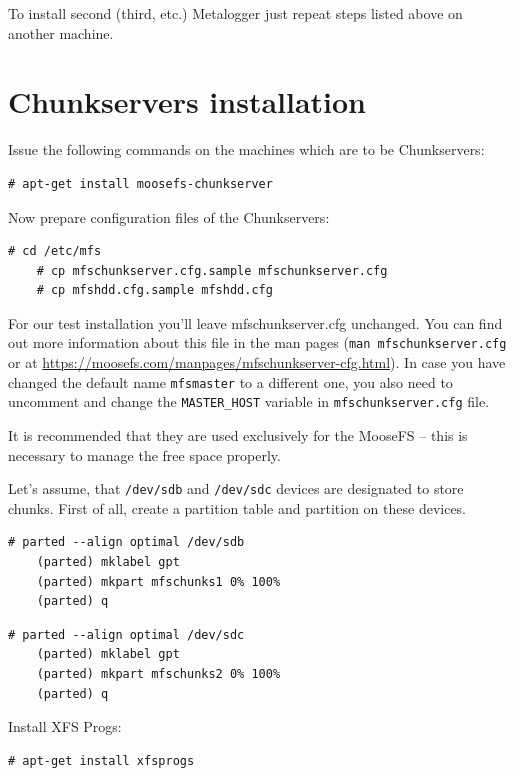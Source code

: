\documentclass[a4paper,11pt,english]{report}
\def\code#1{\texttt{#1}}
\begin{document}
			To install second (third, etc.) Metalogger just repeat steps listed above on another machine.
			
		\section{Chunkservers installation}
			Issue the following commands on the machines which are to be Chunkservers:
			
			\begin{lstlisting}[caption={Installing MooseFS Chunkserver}]
	# apt-get install moosefs-chunkserver
			\end{lstlisting}
			
			
			Now prepare configuration files of the Chunkservers:
			
			\begin{lstlisting}[caption={Preparing configuration files}]
	# cd /etc/mfs
	# cp mfschunkserver.cfg.sample mfschunkserver.cfg
	# cp mfshdd.cfg.sample mfshdd.cfg
			\end{lstlisting}
			
			
			For our test installation you'll leave mfschunkserver.cfg unchanged. You can find out more information about this file in the man pages (\code{man mfschunkserver.cfg} or at \url{https://moosefs.com/manpages/mfschunkserver-cfg.html}).
			In case you have changed the default name \code{mfsmaster} to a different one, you also need to uncomment and change the \code{MASTER\_HOST} variable in \code{mfschunkserver.cfg} file.
			
			It is recommended that they are used exclusively for the MooseFS -- this is necessary to manage the free space properly.
			
			Let's assume, that \code{/dev/sdb} and \code{/dev/sdc} devices are designated to store chunks. First of all, create a partition table and partition on these devices. 
			\begin{lstlisting}[caption={Creating a partition on \code{/dev/sdb}}]
	# parted --align optimal /dev/sdb
	(parted) mklabel gpt
	(parted) mkpart mfschunks1 0% 100%
	(parted) q
			\end{lstlisting}
			
			\begin{lstlisting}[caption={Creating a partition on \code{/dev/sdc}}]
	# parted --align optimal /dev/sdc
	(parted) mklabel gpt
	(parted) mkpart mfschunks2 0% 100%
	(parted) q
			\end{lstlisting}
			
			Install XFS Progs:
			\begin{lstlisting}[caption={Installing \code{xfsprogs} (on Debian/Ubuntu)}]
	# apt-get install xfsprogs
			\end{lstlisting}
			
\end{document}
